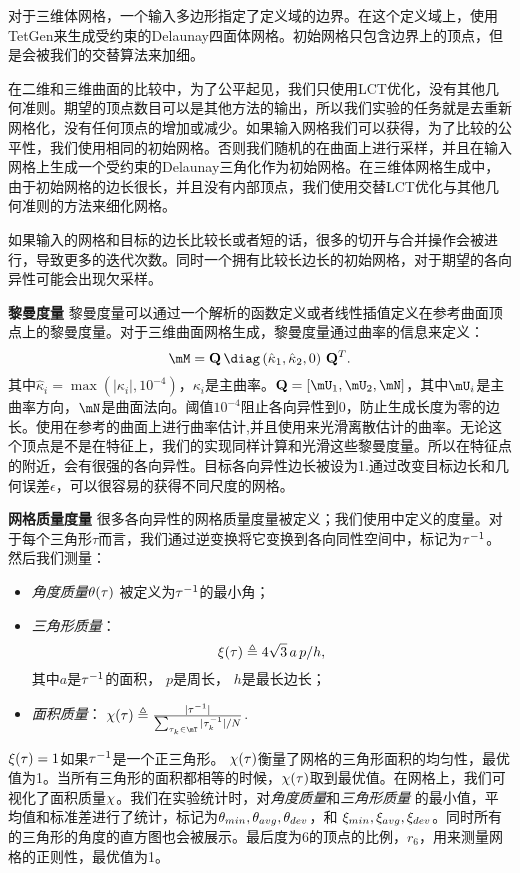 对于三维体网格，一个输入多边形指定了定义域的边界。在这个定义域上，使用TetGen来生成受约束的Delaunay四面体网格。初始网格只包含边界上的顶点，但是会被我们的交替算法来加细。

在二维和三维曲面的比较中，为了公平起见，我们只使用LCT优化，没有其他几何准则。期望的顶点数目可以是其他方法的输出，所以我们实验的任务就是去重新网格化，没有任何顶点的增加或减少。如果输入网格我们可以获得，为了比较的公平性，我们使用相同的初始网格。否则我们随机的在曲面上进行采样，并且在输入网格上生成一个受约束的Delaunay三角化\cite{Yan2009}作为初始网格。在三维体网格生成中，由于初始网格的边长很长，并且没有内部顶点，我们使用交替LCT优化与其他几何准则的方法来细化网格。

如果输入的网格和目标的边长比较长或者短的话，很多的切开与合并操作会被进行，导致更多的迭代次数。同时一个拥有比较长边长的初始网格，对于期望的各向异性可能会出现欠采样。

\textbf{黎曼度量}\quad
黎曼度量可以通过一个解析的函数定义或者线性插值定义在参考曲面顶点上的黎曼度量。对于三维曲面网格生成，黎曼度量通过曲率的信息来定义：
\begin{equation} \label{eqn:curvature_tensor}
\mM = \mathbf{Q}\, \diag\left(\hat{\kappa}_1,\hat{\kappa}_2, 0\right)\,\mathbf{Q}^T.
\end{equation}
其中$\hat{\kappa}_i=\max(|\kappa_i|,10^{-4})$，$\kappa_i$是主曲率。$\mathbf{Q}  = [\mU_1, \mU_2, \mN]$，其中$\mU_i$是主曲率方向，$\mN$是曲面法向。阈值$10^{-4}$阻止各向异性到0，防止生成长度为零的边长。使用\cite{Rusinkiewicz2004}在参考的曲面上进行曲率估计,并且使用\cite{Boissonnat2013}来光滑离散估计的曲率。无论这个顶点是不是在特征上，我们的实现同样计算和光滑这些黎曼度量。所以在特征点的附近，会有很强的各向异性。目标各向异性边长被设为1.通过改变目标边长和几何误差$\epsilon$，可以很容易的获得不同尺度的网格。

\textbf{网格质量度量}\quad
很多各向异性的网格质量度量被定义\cite{Shewchuk2002}；我们使用\cite{Zhong2013}中定义的度量。对于每个三角形$\tau$而言，我们通过逆变换将它变换到各向同性空间中，标记为${\tau^{-1}}$。然后我们测量：
\begin{itemize}
\item \emph{角度质量}$\theta(\tau)$ 被定义为${\tau^{-1}}$的最小角；
\item \emph{三角形质量}：
$$\xi(\tau) \triangleq 4\sqrt{3}\, a \, p / h,$$
其中$a$是${\tau^{-1}}$的面积， $p$是周长， $h$是最长边长；
\item \emph{面积质量}： $\qarea(\tau) \triangleq \frac{|\tauinv|}{\sum_{\tau_k \in \mT} |\tau_k^{-1}|/ N}$.
\end{itemize}
$\xi(\tau)=1$如果${\tau^{-1}}$是一个正三角形。 $\chi(\tau)$衡量了网格的三角形面积的均匀性，最优值为1。当所有三角形的面积都相等的时候，$\chi(\tau)$取到最优值。在网格上，我们可视化了面积质量$\chi$。我们在实验统计时，对\emph{角度质量}和\emph{三角形质量} 的最小值，平均值和标准差进行了统计，标记为$\theta_{min},\theta_{avg},\theta_{dev}$，和 $\xi_{min},\xi_{avg},\xi_{dev}$。同时所有的三角形的角度的直方图也会被展示。最后度为6的顶点的比例，$r_6$，用来测量网格的正则性，最优值为1。

